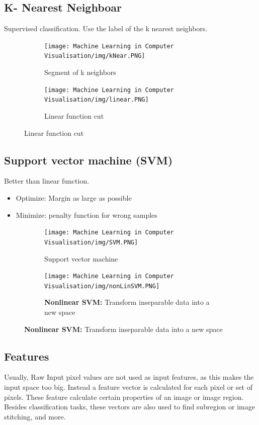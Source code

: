 \documentclass[x11names,11pt,a4paper]{article}
\theoremstyle{definition}
\begin{document}
\subsection{K- Nearest Neighboar}
Supervised classification.\newline
Use the label of the k nearest neighbors.
\begin{figure}[H]
     \centering
     \begin{subfigure}[b]{0.45\textwidth}
         \centering
         \texttt{[image: Machine Learning in Computer Visualisation/img/kNear.PNG]}
         \caption{Segment of k neighbors}
     \end{subfigure}
     \hfill
     \begin{subfigure}[b]{0.45\textwidth}
         \centering
         \texttt{[image: Machine Learning in Computer Visualisation/img/linear.PNG]}
         \caption{Linear function cut}
     \end{subfigure}
\end{figure}



\subsection{Support vector machine (SVM)}
Better than linear function.
\begin{itemize}
    \item Optimize: Margin as large as possible
    \item Minimize: penalty function for wrong samples
\end{itemize}

\begin{figure}[H]
     \centering
     \begin{subfigure}[b]{0.45\textwidth}
         \centering
         \texttt{[image: Machine Learning in Computer Visualisation/img/SVM.PNG]}
         \caption{Support vector machine}
     \end{subfigure}
     \hfill
     \begin{subfigure}[b]{0.45\textwidth}
         \centering
         \texttt{[image: Machine Learning in Computer Visualisation/img/nonLinSVM.PNG]}
         \caption{\textbf{Nonlinear SVM:} Transform inseparable data into a new space}
     \end{subfigure}
\end{figure}




\subsection{Features}
Usually, Raw Input pixel values are not used as input features, as this makes the input space too big. Instead a feature vector is calculated for each pixel or set of pixels. These feature calculate certain properties of an image or image region. Besides classification tasks, these vectors are also used to find subregion or image stitching, and more.
\end{document}

